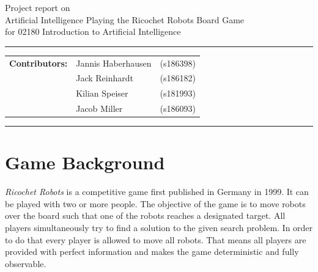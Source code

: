 \documentclass[a4paper,10pt]{article}
\begin{document}
\begin{center}
Project report on\\
\vspace{0.5cm}
{{\Large \sc Artificial Intelligence Playing the Ricochet Robots Board Game}} \\
\vspace{0.5cm} for 02180 Introduction to Artificial Intelligence
\end{center}
\rule{\textwidth}{0.5pt}
\begin{description}
\item\begin{tabular}{rll}
    \textbf{Contributors:}  & Jannis Haberhausen  & (s186398) \\
                            & Jack Reinhardt      & (s186182) \\
                            & Kilian Speiser      & (s181993) \\
                            & Jacob Miller        & (s186093) \\
\end{tabular}
\end{description}
\rule{\textwidth}{1pt}

\tableofcontents
\thispagestyle{empty}
\newpage

\section{Game Background}
\textit{Ricochet Robots} is a competitive game first published in Germany in 1999. It can be played with two or more people. The objective of the game is to move robots over the board such that one of the robots reaches a designated target. All players simultaneously try to find a solution to the given search problem. In order to do that every player is allowed to move all robots. That means all players are provided with perfect information and makes the game deterministic and fully observable.
\end{document}
